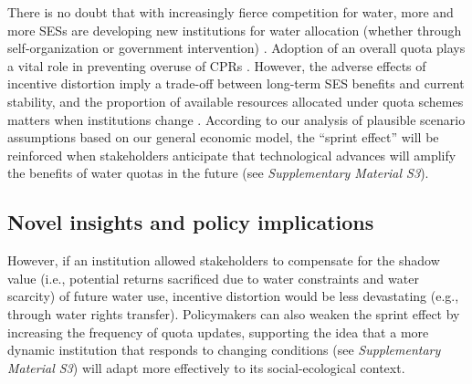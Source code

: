 There is no doubt that with increasingly fierce competition for water, more and more SESs are developing new institutions for water allocation (whether through self-organization or government intervention) \cite{anderssonVoluntaryleadershipemergence2020, wutichWaterScarcitySustainability2009}.
Adoption of an overall quota plays a vital role in preventing overuse of CPRs \cite{tilmanLocalizedprosocialpreferences2019}.
However, the adverse effects of incentive distortion imply a trade-off between long-term SES benefits and current stability, and the proportion of available resources allocated under quota schemes matters when institutions change \cite{ladeRegimeshiftssocialecological2013}.
According to our analysis of plausible scenario assumptions based on our general economic model, the ``sprint effect'' will be reinforced when stakeholders anticipate that technological advances will amplify the benefits of water quotas in the future (see \textit{Supplementary Material S3}).

\subsection{Novel insights and policy implications}
\label{insights}

However, if an institution allowed stakeholders to compensate for the shadow value (i.e., potential returns sacrificed due to water constraints and water scarcity) \cite{howarthAccountingvalueecosystem2002} of future water use, incentive distortion would be less devastating (e.g., through water rights transfer).
Policymakers can also weaken the sprint effect by increasing the frequency of quota updates, supporting the idea that a more dynamic institution that responds to changing conditions (see \textit{Supplementary Material S3}) will adapt more effectively to its social-ecological context.

